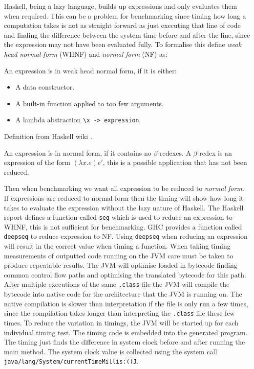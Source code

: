 \documentclass[float=false, crop=false]{standalone}
\begin{document}
Haskell, being a lazy language, builds up expressions and only
evaluates them when required. 
This can be a problem for benchmarking since timing how long a
computation takes is not as straight forward as just executing that line
of code and finding the difference between the system time before and after the line,
since the expression may not have been evaluated fully. 
To formalise this define \textit{weak head normal form} (WHNF) and 
\textit{normal form} (NF) as:
\begin{displayquote}
  An expression is in weak head normal form, if it is either:
  \begin{itemize}
    \item A data constructor.

    \item A built-in function applied to too few arguments.

    \item A lambda abstraction \verb|\x -> expression|.
  \end{itemize}
\end{displayquote}
  \begin{flushright} 
    Definition from Haskell wiki \cite{haskell-whnf}.
  \end{flushright}
  \begin{displayquote}
    An expression is in normal form, if it contains no $\beta$-redexes. 
    A $\beta$-redex is an expression of the form $(\lambda x.e)e'$, 
    this is a possible application that has not been reduced.
  \end{displayquote}
Then when benchmarking we want all expression to be reduced to \textit{normal form}. If expressions
are reduced to normal form then the timing will show how long it takes to evaluate the expression
without the lazy nature of Haskell. 
The Haskell report defines a function called \verb|seq| which is used to 
reduce an expression to WHNF, this is not sufficient for benchmarking. 
GHC provides a function called \verb|deepseq| to reduce expression to NF.
Using \verb|deepseq| when reducing an expression will result in the 
correct value when timing a function.
When taking timing measurements of outputted code running on the JVM care
must be taken to produce repeatable results. The JVM will optimise loaded
in bytecode finding common control flow paths and optimising the translated
bytecode for this path. After multiple executions
of the same \verb|.class| file the JVM will compile the bytecode
into native code for the architecture that the JVM is running on. 
The native compilation is slower than interpretation if the file
is only run a few times, since the compilation takes longer than
interpreting the \verb|.class| file these few times.
To reduce the variation in timings, the JVM will be started up for 
each individual timing test. The timing code is embedded into the
generated program. The timing just finds the difference in 
system clock before and after running the main method. The 
system clock value is collected using the system call
\verb|java/lang/System/currentTimeMillis:()J|.
\end{document}
